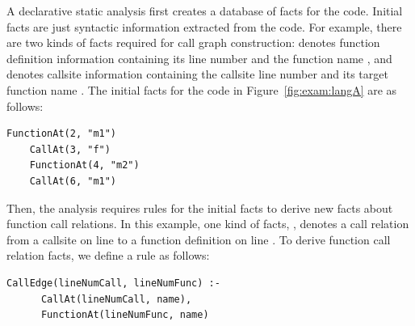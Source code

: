 A declarative static analysis first creates a database of facts for the
code. Initial facts are just syntactic information extracted from the code.
For example, there are two kinds of facts required for call graph
construction:  denotes function definition
information containing its line number  and the function name , and  denotes callsite information
containing the callsite line number  and its target function name . The initial facts for the code in Figure~\ref{fig:exam:langA} are as follows: 


\begin{lstlisting}[style=mrule]
    FunctionAt(2, "m1")
    CallAt(3, "f")
    FunctionAt(4, "m2")
    CallAt(6, "m1")
\end{lstlisting}

Then, the analysis requires rules for the initial facts to derive new facts
about function call relations. In this example, one kind of facts, , denotes a call relation from a callsite on line 
to a function definition on line . To derive function call relation facts,
we define a rule as follows: 


\begin{lstlisting}[style=mrule]
    CallEdge(lineNumCall, lineNumFunc) :-
      CallAt(lineNumCall, name),
      FunctionAt(lineNumFunc, name)
\end{lstlisting}

